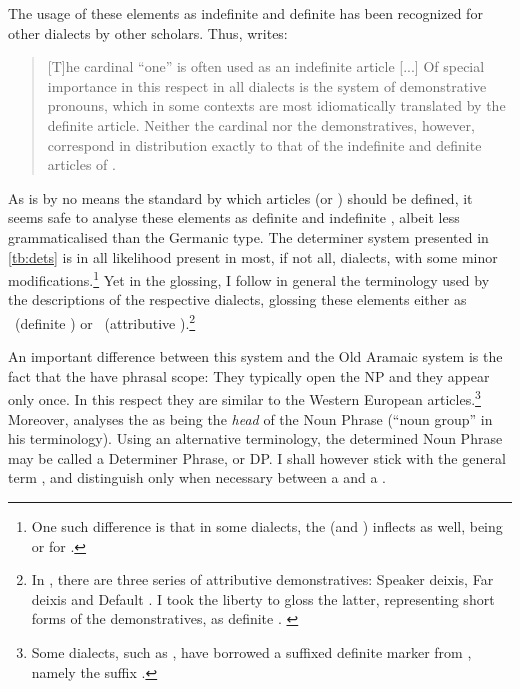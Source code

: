 The usage of these elements as indefinite and definite  has been recognized for other  dialects by other scholars. Thus, \citet[287f.]{KhanDefinitness} writes: \blockquote{[T]he cardinal  \enquote{one} is often used as an indefinite article [...] Of special importance in this respect in all dialects is the system of demonstrative pronouns, which in some contexts are most idiomatically translated by the  definite
article. Neither the cardinal  nor the demonstratives, however, correspond in distribution exactly to that of the indefinite and definite articles of .} 
As  is by no means the standard by which articles (or ) should be defined, it seems safe to analyse these elements as definite and indefinite , albeit less grammaticalised than the Germanic type. The determiner system presented in \vref{tb:dets} is in all likelihood present in most, if not all,  dialects, with some minor modifications.\footnote{One such difference is that in some dialects, the  (and  ) inflects as well, being  or  for \fem* \citep[e.g.\ \Bes:][165]{SinhaBespen}.} Yet  in the glossing, I follow in general the terminology used by the descriptions of the respective dialects, glossing these elements either as \ (definite ) or \dem\ (attributive ).\footnote{In \Barw, there are three series of attributive demonstratives: Speaker deixis, Far deixis and Default \citep[148]{KhanBarwar}. I took the liberty to gloss the latter, representing short forms of the demonstratives, as definite . \label{ft:barw_defi}}

 


An important difference between this system and the Old Aramaic system is the fact that the  have phrasal scope: They typically open the NP and they appear only once. In this respect they are similar to the Western European articles.\footnote{Some dialects, such as \JSul, have  borrowed a suffixed definite marker from \Sor, namely the suffix  \citep[232]{KhanSulemaniyya}.} Moreover, \citet[21]{CohenZakho} analyses the  as being the \emph{head} of the Noun Phrase (\enquote{noun group} in his terminology). Using an alternative terminology,  the determined Noun Phrase may be called a Determiner Phrase, or DP. I shall however stick with the general term , and distinguish only when necessary between a  and a . 

